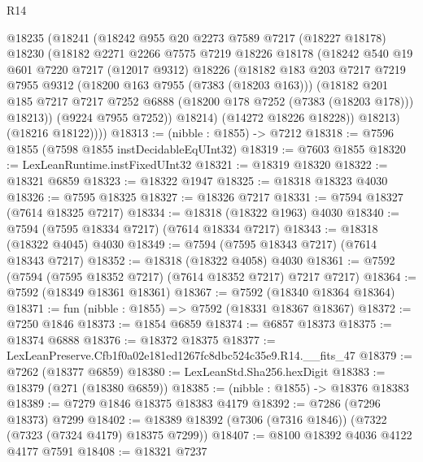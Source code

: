 \begin{lexlean}{R14}
\begin{coremodule}
        @18235
          (@18241
            (@18242
              @955
              @20
              @2273
              @7589
              @7217
              (@18227 @18178)
              @18230
              (@18182
                @2271
                @2266
                @7575
                @7219
                @18226
                @18178
                (@18242
                  @540
                  @19
                  @601
                  @7220
                  @7217
                  (@12017 @9312)
                  @18226
                  (@18182
                    @183
                    @203
                    @7217
                    @7219
                    @7955
                    @9312
                    (@18200 @163 @7955 (@7383 (@18203 @163)))
                    (@18182
                      @201
                      @185
                      @7217
                      @7217
                      @7252
                      @6888
                      (@18200 @178 @7252 (@7383 (@18203 @178)))
                      @18213))
                  (@9224 @7955 @7252))
                @18214)
              (@14272 @18226 @18228))
            @18213)
          (@18216 @18122))))
@18313 := (nibble : @1855) -> @7212
@18318 := @7596 @1855 (@7598 @1855 instDecidableEqUInt32)
@18319 := @7603 @1855
@18320 := LexLeanRuntime.instFixedUInt32
@18321 := @18319 @18320
@18322 := @18321 @6859
@18323 := @18322 @1947
@18325 := @18318 @18323 @4030
@18326 := @7595 @18325
@18327 := @18326 @7217
@18331 := @7594 @18327 (@7614 @18325 @7217)
@18334 := @18318 (@18322 @1963) @4030
@18340 := @7594 (@7595 @18334 @7217) (@7614 @18334 @7217)
@18343 := @18318 (@18322 @4045) @4030
@18349 := @7594 (@7595 @18343 @7217) (@7614 @18343 @7217)
@18352 := @18318 (@18322 @4058) @4030
@18361 := @7592 (@7594 (@7595 @18352 @7217) (@7614 @18352 @7217) @7217 @7217)
@18364 := @7592 (@18349 @18361 @18361)
@18367 := @7592 (@18340 @18364 @18364)
@18371 := fun (nibble : @1855) => @7592 (@18331 @18367 @18367)
@18372 := @7250 @1846
@18373 := @1854 @6859
@18374 := @6857 @18373
@18375 := @18374 @6888
@18376 := @18372 @18375
@18377 := LexLeanPreserve.Cfb1f0a02e181ed1267fc8dbc524c35e9.R14.__fits_47
@18379 := @7262 (@18377 @6859)
@18380 := LexLeanStd.Sha256.hexDigit
@18383 := @18379 (@271 (@18380 @6859))
@18385 := (nibble : @1855) -> @18376 @18383
@18389 := @7279 @1846 @18375 @18383 @4179
@18392 := @7286 (@7296 @18373) @7299
@18402 := @18389 @18392 (@7306 (@7316 @1846)) (@7322 (@7323 (@7324 @4179) @18375 @7299))
@18407 := @8100 @18392 @4036 @4122 @4177 @7591
@18408 := @18321 @7237

\end{coremodule}
\end{lexlean}
